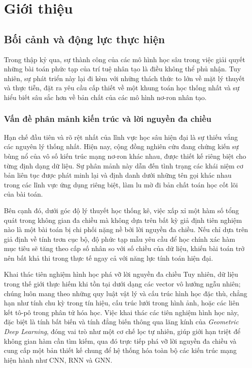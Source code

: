 \section{Giới thiệu}
\label{sec:gioi-thieu}

\subsection{Bối cảnh và động lực thực hiện}
\label{subsec:boi-canh}

Trong thập kỷ qua, sự thành công của các mô hình học sâu trong việc giải quyết những bài toán phức tạp của trí tuệ nhân tạo là điều không thể phủ nhận. Tuy nhiên, sự phát triển này lại đi kèm với những thách thức to lớn về mặt lý thuyết và thực tiễn, đặt ra yêu cầu cấp thiết về một khung toán học thống nhất và sự hiểu biết sâu sắc hơn về bản chất của các mô hình nơ-ron nhân tạo.

\subsubsection{Vấn đề phân mảnh kiến trúc và lời nguyền đa chiều}
\label{subsubsec:phan-manh-kien-truc}

Hạn chế đầu tiên và rõ rệt nhất của lĩnh vực học sâu hiện đại là sự thiếu vắng các nguyên lý thống nhất. Hiện nay, cộng đồng nghiên cứu đang chứng kiến sự bùng nổ của vô số kiến trúc mạng nơ-ron khác nhau, được thiết kế riêng biệt cho từng định dạng dữ liệu. Sự phân mảnh này dẫn đến tình trạng các khái niệm cơ bản liên tục được phát minh lại và định danh dưới những tên gọi khác nhau trong các lĩnh vực ứng dụng riêng biệt, làm lu mờ đi bản chất toán học cốt lõi của bài toán.

Bên cạnh đó, dưới góc độ lý thuyết học thống kê, việc xấp xỉ một hàm số tổng quát trong không gian đa chiều mà không dựa trên bất kỳ giả định tiên nghiệm nào là một bài toán bị chi phối nặng nề bởi lời nguyền đa chiều. Nếu chỉ dựa trên giả định về tính trơn cục bộ, độ phức tạp mẫu yêu cầu để học chính xác hàm mục tiêu sẽ tăng theo cấp số nhân so với số chiều của dữ liệu, khiến bài toán trở nên bất khả thi trong thực tế ngay cả với năng lực tính toán hiện đại.

\begin{infobox}{Khai thác tiên nghiệm hình học phá vỡ lời nguyền đa chiều}
Tuy nhiên, dữ liệu trong thế giới thực hiếm khi tồn tại dưới dạng các vector vô hướng ngẫu nhiên; chúng luôn mang theo những quy luật vật lý và cấu trúc hình học đặc thù, chẳng hạn như tính chu kỳ trong tín hiệu, cấu trúc lưới trong hình ảnh, hoặc các liên kết tô-pô trong phân tử hóa học. Việc khai thác các tiên nghiệm hình học này, đặc biệt là tính bất biến và tính đẳng biến thông qua lăng kính của \textit{Geometric Deep Learning}, đóng vai trò như một cơ chế lọc tự nhiên, giúp giới hạn triệt để không gian hàm cần tìm kiếm, qua đó trực tiếp phá vỡ lời nguyền đa chiều và cung cấp một bản thiết kế chung để hệ thống hóa toàn bộ các kiến trúc mạng hiện hành như CNN, RNN và GNN.
\end{infobox}

